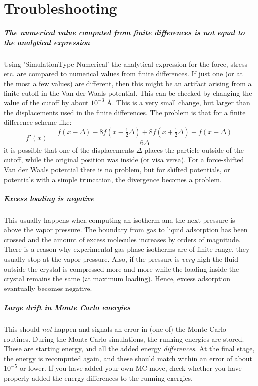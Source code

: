 \chapter{Troubleshooting}

\paragraph*{The numerical value computed from finite differences is not equal to the analytical expression}
Using 'SimulationType Numerical' the analytical expression for the force, stress etc. are compared to numerical values from finite differences.
If just one (or at the most a few values) are different, then this might be an artifact arising from a finite cutoff in the Van der Waals potential.
This can be checked by changing the value of the cutoff by about $10^{-3}$ \AA. This is a very small change, but larger than the displacements used in the finite
differences. The problem is that for a finite difference scheme like:
\begin{equation}
 f'\left(x\right)=\frac{f\left(x-\Delta\right)-8f\left(x-\frac{1}{2}\Delta\right)+8 f\left(x+\frac{1}{2}\Delta\right)-f\left(x+\Delta\right)}{6\Delta}
\end{equation}
it is possible that one of the displacements $\Delta$ places the particle outside of the cutoff, while the original position was inside (or visa versa).
For a force-shifted Van der Waals potential there is no problem, but for shifted
potentials, or potentials with a simple truncation, the divergence becomes a problem.

\paragraph*{Excess loading is negative}
This usually happens when computing an isotherm and the next pressure is above the vapor pressure. The boundary from gas to liquid adsorption has been crossed
and the amount of excess molecules increases by orders of magnitude. There is a reason why experimental gas-phase isotherms are of finite range, they usually stop at the 
vapor pressure. Also, if the pressure is \emph{very} high the fluid outside the crystal is compressed more and more while the loading inside the crystal remains the same
(at maximum loading). Hence, excess adsorption evantually becomes negative.

\paragraph*{Large drift in Monte Carlo energies}
This should \emph{not} happen and signals an error in (one of) the Monte Carlo routines. 
During the Monte Carlo simulations, the running-energies are stored. These are starting energy,
and all the added energy \emph{differences}. At the final stage, the energy is recomputed again, and these should match within an error of about $10^{-5}$ or lower.
If you have added your own MC move, check whether you have properly added the energy differences to the running energies.

